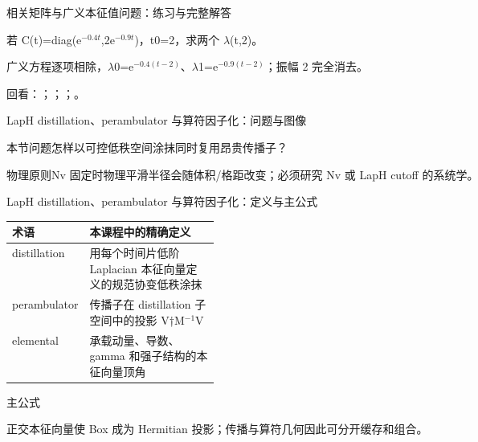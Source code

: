 \begin{frame}[t]{相关矩阵与广义本征值问题：练习与完整解答}
\footnotesize
\begin{block}{}若 C(t)=diag(e\ensuremath{^{-0.4t}},2e\ensuremath{^{-0.9t}})，t0=2，求两个 \ensuremath{\lambda}(t,2)。\end{block}
\begin{exampleblock}{}广义方程逐项相除，\ensuremath{\lambda}0=e\ensuremath{^{-0.4(t-2)}}、\ensuremath{\lambda}1=e\ensuremath{^{-0.9(t-2)}}；振幅 2 完全消去。\end{exampleblock}
\vfill
\scriptsize 回看：；；；。
\end{frame}

\begin{frame}[t]{LapH distillation、perambulator 与算符因子化：问题与图像}
\footnotesize
\begin{block}{本节问题}怎样以可控低秩空间涂抹同时复用昂贵传播子？\end{block}
\begin{block}{物理原则}\quad Nv 固定时物理平滑半径会随体积/\allowbreak{}格距改变；必须研究 Nv 或 LapH cutoff 的系统学。\end{block}
\end{frame}

\begin{frame}[t]{LapH distillation、perambulator 与算符因子化：定义与主公式}
\footnotesize\begin{tabularx}{\linewidth}{p{0.30\linewidth}Y}
\toprule 术语 & 本课程中的精确定义\\\midrule
{} distillation & 用每个时间片低阶 Laplacian 本征向量定义的规范协变低秩涂抹\\
 perambulator & 传播子在 distillation 子空间中的投影 V†M\ensuremath{^{-1}}V\\
 elemental & 承载动量、导数、gamma 和强子结构的本征向量顶角\\
\bottomrule\end{tabularx}\vspace{0.15cm}
\begin{block}{ 主公式}\centering{}\end{block}
正交本征向量使 Box 成为 Hermitian 投影；传播与算符几何因此可分开缓存和组合。
\end{frame}

